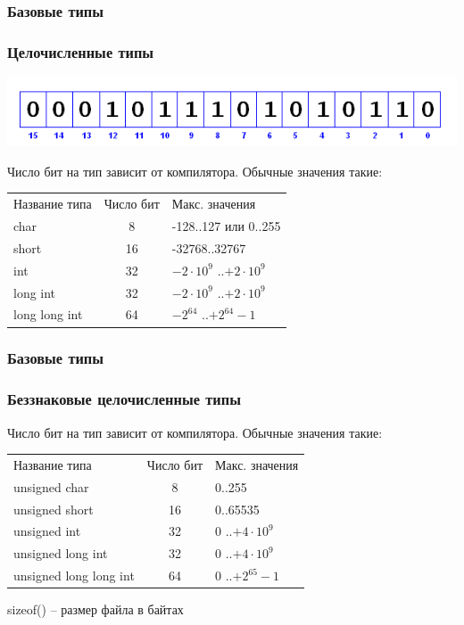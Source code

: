 \documentclass[12pt,pdf,hyperref={unicode}]{beamer}
\begin{document}
\begin{frame}
\frametitle{Базовые типы}
\frametitle{Целочисленные типы} 
\begin{center}
\includegraphics[scale=0.5]{bit_positions.png}
\end{center}
Число бит на тип зависит от компилятора. Обычные значения такие:
\begin{center}
\begin{tabular}{ l c l }
  Название типа & Число бит & Макс. значения \\
  char & 8 & -128..127 или 0..255 \\
  short & 16 & -32768..32767 \\
  int & 32 & $-2 \cdot 10^9$ ..$+2 \cdot 10^9$ \\
  long int & 32& $-2 \cdot 10^9$ ..$+2 \cdot 10^9$ \\
  long long int & 64 & $-2^{64}$ ..$+2^{64}-1$ \\
\end{tabular}
\end{center}
\end{frame}

\begin{frame}
\frametitle{Базовые типы}
\frametitle{Беззнаковые целочисленные типы} 
Число бит на тип зависит от компилятора. Обычные значения такие:
\begin{center}
\begin{tabular}{ l c l }
  Название типа & Число бит & Макс. значения \\
  unsigned char & 8 & 0..255 \\
  unsigned short & 16 & 0..65535 \\
  unsigned int & 32 & $0$ ..$+4 \cdot 10^9$ \\
  unsigned long int & 32& $0$ ..$+4 \cdot 10^9$ \\
  unsigned long long int & 64 & $0$ ..$+2^{65}-1$ \\
\end{tabular}
\end{center}
sizeof() -- размер файла в байтах
\end{frame}
\end{document}
